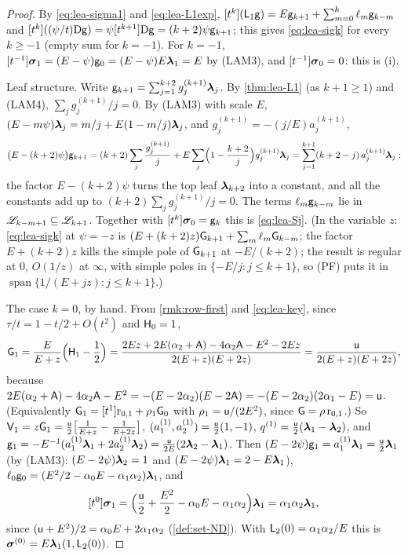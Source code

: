 \begin{proof}
By \eqref{eq:lea-sigma1} and \eqref{eq:lea-L1exp}, $[t^k](\mathsf{L}_1\mathsf{g}) = E\mathsf{g}_{k+1} + \sum_{m=0}^{k}\ell_m\mathsf{g}_{k-m}$ and $[t^k]((\psi/t)\mathrm{D}\mathsf{g}) = \psi[t^{k+1}]\mathrm{D}\mathsf{g} = (k+2)\psi\mathsf{g}_{k+1}$; this gives \eqref{eq:lea-sigk} for every $k\geq -1$ (empty sum for $k = -1$). For $k = -1$, $[t^{-1}]\boldsymbol{\sigma}_1 = (E-\psi)\mathsf{g}_0 = (E-\psi)E\boldsymbol{\lambda}_1 = E$ by (LAM3), and $[t^{-1}]\boldsymbol{\sigma}_0 = 0$: this is (i).

Leaf structure. Write $\mathsf{g}_{k+1} = \sum_{j=1}^{k+2}g_j^{(k+1)}\boldsymbol{\lambda}_j$. By \cref{thm:lea-L1} (as $k+1\geq 1$) and (LAM4), $\sum_jg_j^{(k+1)}/j = 0$. By (LAM3) with scale $E$, $(E-m\psi)\boldsymbol{\lambda}_j = m/j + E(1-m/j)\boldsymbol{\lambda}_j$, and $g_j^{(k+1)} = -(j/E)a_j^{(k+1)}$,
\[
\bigl(E-(k+2)\psi\bigr)\mathsf{g}_{k+1} = (k+2)\sum_j\frac{g_j^{(k+1)}}{j} + E\sum_j\Bigl(1-\frac{k+2}{j}\Bigr)g_j^{(k+1)}\boldsymbol{\lambda}_j = \sum_{j=1}^{k+1}(k+2-j)\,a_j^{(k+1)}\boldsymbol{\lambda}_j :
\]
the factor $E-(k+2)\psi$ turns the top leaf $\boldsymbol{\lambda}_{k+2}$ into a constant, and all the constants add up to $(k+2)\sum_jg_j^{(k+1)}/j = 0$. The terms $\ell_m\mathsf{g}_{k-m}$ lie in $\mathscr{L}_{k-m+1}\subseteq\mathscr{L}_{k+1}$. Together with $[t^k]\boldsymbol{\sigma}_0 = \mathsf{g}_k$ this is \eqref{eq:lea-Sj}. (In the variable $z$: \eqref{eq:lea-sigk} at $\psi = -z$ is $(E+(k+2)z)\mathsf{G}_{k+1} + \sum_m\ell_m\mathsf{G}_{k-m}$; the factor $E+(k+2)z$ kills the simple pole of $\mathsf{G}_{k+1}$ at $-E/(k+2)$; the result is regular at $0$, $O(1/z)$ at $\infty$, with simple poles in $\{-E/j : j\leq k+1\}$, so (PF) puts it in $\operatorname{span}\{1/(E+jz) : j\leq k+1\}$.)

The case $k = 0$, by hand. From \cref{rmk:row-first} and \eqref{eq:lea-key}, since $\tau/t = 1 - t/2 + O(t^2)$ and $\mathsf{H}_0 = 1$,
\[
\mathsf{G}_1 = \frac{E}{E+z}\Bigl(\mathsf{H}_1 - \frac12\Bigr) = \frac{2Ez + 2E(\alpha_2+\mathsf{A}) - 4\alpha_2\mathsf{A} - E^2 - 2Ez}{2(E+z)(E+2z)} = \frac{\mathsf{u}}{2(E+z)(E+2z)},
\]
because $2E(\alpha_2+\mathsf{A}) - 4\alpha_2\mathsf{A} - E^2 = -(E-2\alpha_2)(E-2\mathsf{A}) = -(E-2\alpha_2)(2\alpha_1-E) = \mathsf{u}$. (Equivalently $\mathsf{G}_1 = [t^1]\mathrm{r}_{0,1} + \rho_1\mathsf{G}_0$ with $\rho_1 = \mathsf{u}/(2E^2)$, since $\mathsf{G} = \rho\,\mathrm{r}_{0,1}$.) So $\mathsf{V}_1 = z\mathsf{G}_1 = \frac{\mathsf{u}}{2}\bigl[\frac{1}{E+z} - \frac{1}{E+2z}\bigr]$, $(a_1^{(1)},a_2^{(1)}) = \frac{\mathsf{u}}{2}(1,-1)$, $q^{(1)} = \frac{\mathsf{u}}{2}(\boldsymbol{\lambda}_1-\boldsymbol{\lambda}_2)$, and $\mathsf{g}_1 = -E^{-1}(a_1^{(1)}\boldsymbol{\lambda}_1 + 2a_2^{(1)}\boldsymbol{\lambda}_2) = \frac{\mathsf{u}}{2E}(2\boldsymbol{\lambda}_2-\boldsymbol{\lambda}_1)$. Then $(E-2\psi)\mathsf{g}_1 = a_1^{(1)}\boldsymbol{\lambda}_1 = \frac{\mathsf{u}}{2}\boldsymbol{\lambda}_1$ (by (LAM3): $(E-2\psi)\boldsymbol{\lambda}_2 = 1$ and $(E-2\psi)\boldsymbol{\lambda}_1 = 2 - E\boldsymbol{\lambda}_1$), $\ell_0\mathsf{g}_0 = (E^2/2 - \alpha_0E - \alpha_1\alpha_2)\boldsymbol{\lambda}_1$, and
\[
[t^0]\boldsymbol{\sigma}_1 = \Bigl(\frac{\mathsf{u}}{2} + \frac{E^2}{2} - \alpha_0E - \alpha_1\alpha_2\Bigr)\boldsymbol{\lambda}_1 = \alpha_1\alpha_2\boldsymbol{\lambda}_1,
\]
since $(\mathsf{u}+E^2)/2 = \alpha_0E + 2\alpha_1\alpha_2$ (\cref{def:set-ND}). With $\mathsf{L}_2(0) = \alpha_1\alpha_2/E$ this is $\boldsymbol{\sigma}^{(0)} = E\boldsymbol{\lambda}_1(1,\mathsf{L}_2(0))$.
\end{proof}

